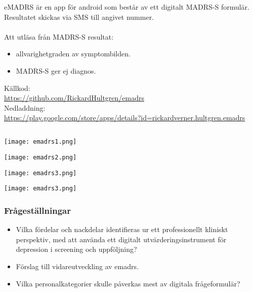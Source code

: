 \documentclass[english]{beamer}
\begin{document}
\subsection{}
\begin{frame}
\ \\ 
eMADRS är en app för android som består av ett digitalt MADRS-S formulär. Resultatet skickas via SMS till angivet nummer.\\\ \\

Att utläsa från MADRS-S resultat:
	\begin{itemize}
	\item allvarighetgraden av symptombilden.
	\item MADRS-S ger ej diagnos.
	\end{itemize}
Källkod:\\
\href{https://github.com/RickardHultgren/emadrs}{\url{https://github.com/RickardHultgren/emadrs}}\\
Nedladdning:\\
\href{https://play.google.com/store/apps/details?id=rickardverner.hultgren.emadrs}{\url{https://play.google.com/store/apps/details?id=rickardverner.hultgren.emadrs}}

\end{frame}

\subsection{}
\begin{frame}
\texttt{[image: emadrs1.png]}
\end{frame}

\begin{frame}
\texttt{[image: emadrs2.png]}
\end{frame}

\begin{frame}
\texttt{[image: emadrs3.png]}
\end{frame}

\begin{frame}
\texttt{[image: emadrs3.png]}
\end{frame}


\begin{frame}
\frametitle{Frågeställningar}
	\begin{itemize}
	\item Vilka fördelar och nackdelar identifieras ur ett professionellt kliniskt perspektiv, med att använda ett digitalt utvärderingsinstrument för depression i screening och uppföljning?
	\item Förslag till vidareutveckling av emadrs.
	\item Vilka personalkategorier skulle påverkas mest av digitala frågeformulär?
	\end{itemize}
\end{frame}
\end{document}
